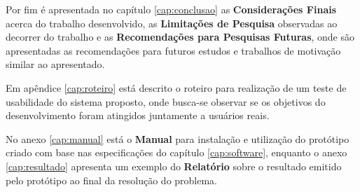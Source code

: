 Por fim é apresentada no capítulo \ref{cap:conclusao} as \textbf{Considerações Finais} acerca do trabalho desenvolvido, as \textbf{Limitações de Pesquisa} observadas ao decorrer do trabalho e as \textbf{Recomendações para Pesquisas Futuras}, onde são apresentadas as recomendações para futuros estudos e trabalhos de motivação similar ao apresentado.

Em apêndice \ref{cap:roteiro} está descrito o roteiro para realização de um teste de usabilidade do sistema proposto, onde busca-se observar se os objetivos do desenvolvimento foram atingidos juntamente a usuários reais.

No anexo \ref{cap:manual} está o \textbf{Manual} para instalação e utilização do protótipo criado com base nas especificações do capítulo \ref{cap:software}, enquanto o anexo \ref{cap:resultado} apresenta um exemplo do \textbf{Relatório} sobre o resultado emitido pelo protótipo ao final da resolução do problema.

